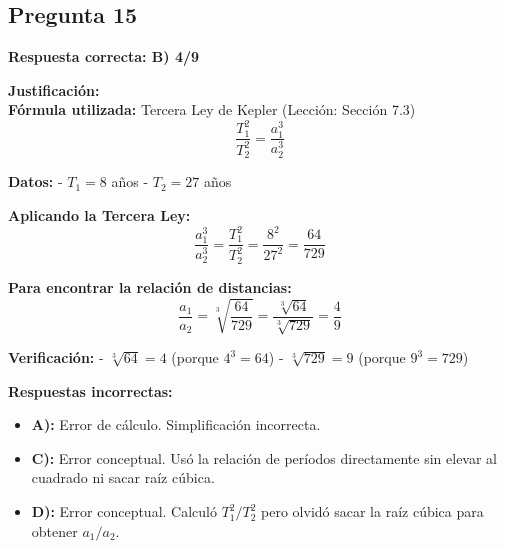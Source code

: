 \begin{respuestabox}
\subsection{Pregunta 15}
\textcolor{verdecorrecto}{\textbf{Respuesta correcta: B) 4/9}}

\textbf{Justificación:}\\
\textbf{Fórmula utilizada:} Tercera Ley de Kepler (Lección: Sección 7.3)
$$\frac{T_1^2}{T_2^2} = \frac{a_1^3}{a_2^3}$$

\textbf{Datos:}
- $T_1 = 8$ años
- $T_2 = 27$ años

\textbf{Aplicando la Tercera Ley:}
$$\frac{a_1^3}{a_2^3} = \frac{T_1^2}{T_2^2} = \frac{8^2}{27^2} = \frac{64}{729}$$

\textbf{Para encontrar la relación de distancias:}
$$\frac{a_1}{a_2} = \sqrt[3]{\frac{64}{729}} = \frac{\sqrt[3]{64}}{\sqrt[3]{729}} = \frac{4}{9}$$

\textbf{Verificación:}
- $\sqrt[3]{64} = 4$ (porque $4^3 = 64$)
- $\sqrt[3]{729} = 9$ (porque $9^3 = 729$)

\textbf{Respuestas incorrectas:}
\begin{itemize}
    \item \textbf{A):} Error de cálculo. Simplificación incorrecta.
    \item \textbf{C):} Error conceptual. Usó la relación de períodos directamente sin elevar al cuadrado ni sacar raíz cúbica.
    \item \textbf{D):} Error conceptual. Calculó $T_1^2/T_2^2$ pero olvidó sacar la raíz cúbica para obtener $a_1/a_2$.
\end{itemize}
\end{respuestabox}